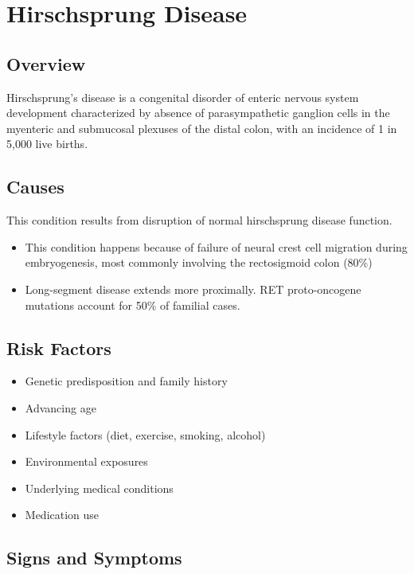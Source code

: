 \chapter{Hirschsprung Disease}
\label{sec:Hirschsprung Disease}

\section{Overview}
Hirschsprung's disease is a congenital disorder of enteric nervous system development characterized by absence of parasympathetic ganglion cells in the myenteric and submucosal plexuses of the distal colon, with an incidence of 1 in 5,000 live births.
\section{Causes}
This condition results from disruption of normal hirschsprung disease function.

\begin{itemize}[noitemsep]
  \item This condition happens because of failure of neural crest cell migration during embryogenesis, most commonly involving the rectosigmoid colon (80\%)
  \item Long-segment disease extends more proximally. RET proto-oncogene mutations account for 50\% of familial cases.
\end{itemize}
\section{Risk Factors}


\begin{itemize}[noitemsep]
  \item Genetic predisposition and family history
  \item Advancing age
  \item Lifestyle factors (diet, exercise, smoking, alcohol)
  \item Environmental exposures
  \item Underlying medical conditions
  \item Medication use
\end{itemize}
\section{Signs and Symptoms}

